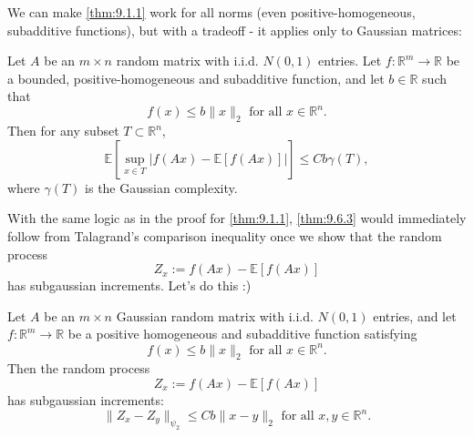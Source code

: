 We can make \cref{thm:9.1.1} work for all norms (even positive-homogeneous, subadditive functions), but with a 
tradeoff - it applies only to Gaussian matrices:

\begin{theorem}
\label{thm:9.6.3}
Let $A$ be an $m \times n$ random matrix with i.i.d. $N(0, 1)$ entries. Let $f: \mathbb{R}^m \to \mathbb{R}$ be 
a bounded, positive-homogeneous and subadditive function, and let $b \in \mathbb{R}$ such that 
\[ f(x) \leq b \lVert x \rVert_{2} \text{ for all } x \in \mathbb{R}^n. \]
Then for any subset $T \subset \mathbb{R}^n$, 
\[ \mathbb{E}\left[ \sup_{x \in T} \left| f(Ax) - \mathbb{E}\left[ f(Ax) \right] \right| \right] 
\leq Cb \gamma(T), \]
where $\gamma(T)$ is the Gaussian complexity.
\end{theorem}

With the same logic as in the proof for \cref{thm:9.1.1}, \cref{thm:9.6.3} would immediately follow from 
Talagrand's comparison inequality once we show that the random process
\[ Z_x := f(Ax) - \mathbb{E}\left[ f(Ax) \right] \]
has subgaussian increments. Let's do this :)

\begin{theorem}
\label{thm:9.6.4}
Let $A$ be an $m \times n$ Gaussian random matrix with i.i.d. $N(0, 1)$ entries, and let $f: \mathbb{R}^m \to 
\mathbb{R}$ be a positive homogeneous and subadditive function satisfying 
\[ f(x) \leq b \lVert x \rVert_{2} \text{ for all } x \in \mathbb{R}^n. \]
Then the random process 
\[ Z_x := f(Ax) - \mathbb{E}\left[ f(Ax) \right] \]
has subgaussian increments:
\[ \lVert Z_x - Z_y \rVert_{\psi_2} \leq Cb \lVert x - y \rVert_{2} \text{ for all } x, y \in \mathbb{R}^n. \]
\end{theorem}

